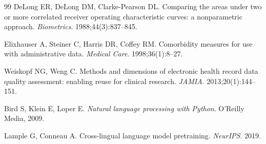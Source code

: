 \documentclass[11pt,a4paper]{article}
\begin{document}
\begin{thebibliography}{99}
DeLong ER, DeLong DM, Clarke-Pearson DL. Comparing the areas under two or more correlated receiver operating characteristic curves: a nonparametric approach. \textit{Biometrics}. 1988;44(3):837--845.

Elixhauser A, Steiner C, Harris DR, Coffey RM. Comorbidity measures for use with administrative data. \textit{Medical Care}. 1998;36(1):8--27.

Weiskopf NG, Weng C. Methods and dimensions of electronic health record data quality assessment: enabling reuse for clinical research. \textit{JAMIA}. 2013;20(1):144--151.

Bird S, Klein E, Loper E. \textit{Natural language processing with Python}. O'Reilly Media, 2009.

Lample G, Conneau A. Cross-lingual language model pretraining. \textit{NeurIPS}. 2019.

\end{thebibliography}
\end{document}
